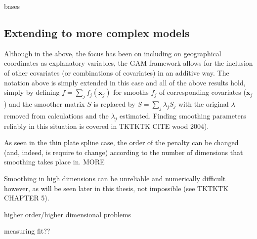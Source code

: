 bases


\subsection{Extending to more complex models}

Although in the above, the focus has been on including on geographical coordinates as explanatory variables, the GAM framework allows for the inclusion of other covariates (or combinations of covariates) in an additive way. The notation above is simply extended in this case and all of the above results hold, simply by defining $f=\sum_j f_j(\mathbf{x}_j)$ for smooths $f_j$ of corresponding covariates ($\mathbf{x}_j$) and the smoother matrix $S$ is replaced by $S= \sum_j \lambda_j S_j$ with the original $\lambda$ removed from calculations and the $\lambda_j$ estimated. Finding smoothing parameters reliably in this situation is covered in TKTKTK CITE wood 2004).

As seen in the thin plate spline case, the order of the penalty can be changed (and, indeed, is require to change) according to the number of dimensions that smoothing takes place in. MORE

Smoothing in high dimensions can be unreliable and numerically difficult however, as will be seen later in this thesis, not impossible (see TKTKTK CHAPTER 5).

higher order/higher dimensional problems


measuring fit??



